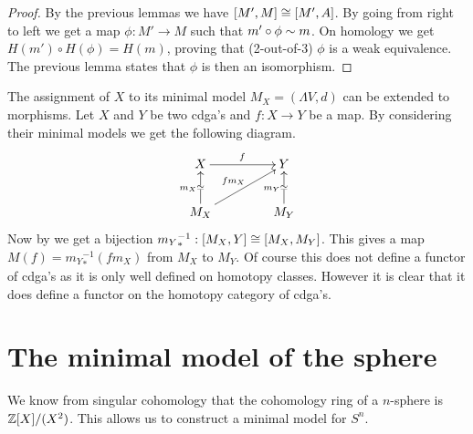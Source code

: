 \begin{proof}
	By the previous lemmas we have $[M', M] \cong [M', A]$. By going from right to left we get a map $\phi: M' \to M$ such that $m' \circ \phi \sim m$. On homology we get $H(m') \circ H(\phi) = H(m)$, proving that (2-out-of-3) $\phi$ is a weak equivalence. The previous lemma states that $\phi$ is then an isomorphism.
\end{proof}

The assignment of $X$ to its minimal model $M_X = (\Lambda V, d)$ can be extended to morphisms. Let $X$ and $Y$ be two cdga's and $f: X \to Y$ be a map. By considering their minimal models we get the following diagram.
\begin{displaymath}
	\xymatrix @C=1.5cm{
	X \ar[r]^f & Y \\
	M_X \arwe[u]^{m_X} \ar[ur]^{f m_X} & M_Y \arwe[u]^{m_Y}
	}
\end{displaymath}
Now by  we get a bijection ${m_Y}_\ast^{-1} : [M_X, Y] \cong [M_X, M_Y]$. This gives a map $M(f) = {m_Y}_\ast^{-1} (f m_X)$ from $M_X$ to $M_Y$. Of course this does not define a functor of cdga's as it is only well defined on homotopy classes. However it is clear that it does define a functor on the homotopy category of cdga's.


\section{The minimal model of the sphere}
We know from singular cohomology that the cohomology ring of a $n$-sphere is $\mathbb{Z}[X] / (X^2)$. This allows us to construct a minimal model for $S^n$.

